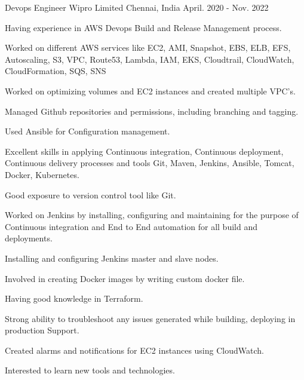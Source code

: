 \begin{cventries}
  \cventry
    {Devops Engineer} %
    {Wipro Limited} %
    {Chennai, India} %
    {April. 2020 - Nov. 2022} %
    {
      \begin{cvitems} %
      	\item {Having experience in AWS Devops Build and Release Management process.}
        \item {Worked on different AWS services like EC2, AMI, Snapshot, EBS, ELB, EFS, Autoscaling, S3, VPC, Route53, Lambda, IAM, EKS, Cloudtrail, CloudWatch, CloudFormation, SQS, SNS }
        \item {Worked on optimizing volumes and EC2 instances and created multiple VPC's.}
        \item {Managed Github repositories and permissions, including branching and tagging.}
        \item {Used Ansible for Configuration management.}
        \item {Excellent skills in applying Continuous integration, Continuous deployment, Continuous delivery processes and tools Git, Maven,  Jenkins, Ansible, Tomcat, Docker, Kubernetes.}
        \item {Good exposure to version control tool like Git.}
        \item {Worked on Jenkins by installing, configuring and maintaining for the purpose of Continuous integration and End to End automation for all build and deployments.}
        \item {Installing and configuring Jenkins master and slave nodes.}
        \item {Involved in creating Docker images by writing custom docker file.}
        \item {Having good knowledge in Terraform.}
        \item {Strong ability to troubleshoot any issues generated while building, deploying in production Support.}
        \item {Created alarms and notifications for EC2 instances using CloudWatch.}
        \item {Interested to learn new tools and technologies.}
      \end{cvitems}
    }




\end{cventries}
